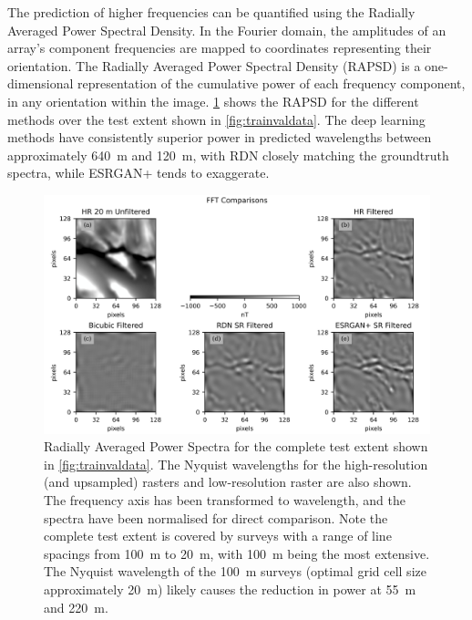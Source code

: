 \documentclass[manuscript.tex]{subfiles}
\begin{document}
The prediction of higher frequencies can be quantified using the Radially Averaged Power Spectral Density.
In the Fourier domain, the amplitudes of an array's component frequencies are mapped to coordinates representing their orientation.
The Radially Averaged Power Spectral Density (RAPSD) \parencite{ulichneyDitheringBlueNoise1988} is a one-dimensional representation of the cumulative power of each frequency component, in any orientation within the image.
\cref{fig:rapsd} shows the RAPSD for the different methods over the test extent shown in \cref{fig:trainvaldata}. The deep learning methods have consistently superior power in predicted wavelengths between approximately \SI{640}{\metre} and \SI{120}{\metre}, with RDN\textdaggerdbl{} closely matching the groundtruth spectra, while ESRGAN+ tends to exaggerate.


\begin{figure}[hbt]
    \includegraphics[width=\textwidth]{fig/p1/image8.png}
    \caption[short]{Radially Averaged Power Spectra for the complete test extent shown in \cref{fig:trainvaldata}.
        The Nyquist wavelengths for the high-resolution (and upsampled) rasters and low-resolution raster are also shown.
        The frequency axis has been transformed to wavelength, and the spectra have been normalised for direct comparison.
        Note the complete test extent is covered by surveys with a range of line spacings from \SI{100}{\metre} to \SI{20}{\metre}, with \SI{100}{\metre} being the most extensive.
        The Nyquist wavelength of the \SI{100}{\metre} surveys (optimal grid cell size approximately \SI{20}{\metre}) likely causes the reduction in power at \SI{55}{\metre} and \SI{220}{\metre}.
    }
    \label{fig:rapsd}
\end{figure}
\end{document}

